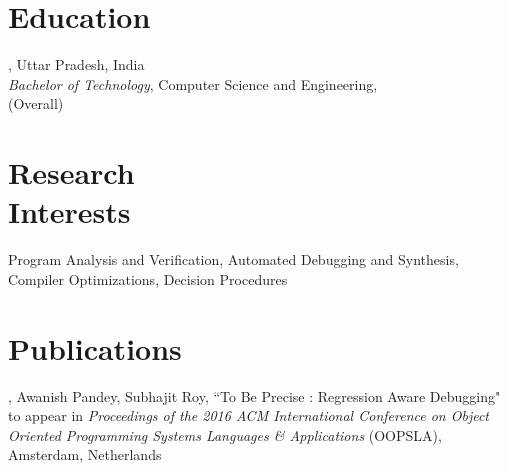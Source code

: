 \documentclass[mm]{simple_style}
\begin{document}

\address{C-324, Hall-1\\IIT Kanpur\\Kanpur, Uttar Pradesh, India}

\begin{resume}

\section{Education}
, Uttar Pradesh, India\\
{\sl Bachelor of Technology}, Computer Science and Engineering, \\
 (Overall)\\
\sectionline

\section{Research\\Interests}
\par
Program Analysis and Verification, Automated Debugging and Synthesis, \\Compiler Optimizations, Decision Procedures

\section{Publications}
, Awanish Pandey, Subhajit Roy, ``To Be Precise : Regression Aware Debugging" to appear in \textit{Proceedings of the 2016 ACM International Conference on Object Oriented Programming Systems Languages \& Applications} (OOPSLA), Amsterdam, Netherlands


\end{resume}
\end{document}
